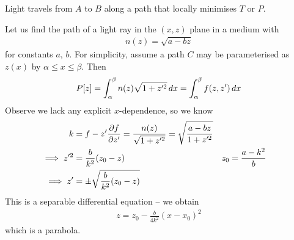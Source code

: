 \documentclass{../../template/note}
\begin{document}
    \begin{proposition}
        Light travels from $A$ to $B$ along a path that locally minimises $T$ or $P$.
    \end{proposition}
    
    \begin{example*}
        Let us find the path of a light ray in the $(x, z)$ plane in a medium with
        \begin{align*}
            n(z) = \sqrt{a-bz}
        \end{align*}
        for constants $a$, $b$. For simplicity, assume a path $C$ may be parameterised as $z(x)$ by $\alpha \leq x \leq \beta$. Then
        \begin{align*}
            P[z] = \int_\alpha^\beta n(z) \sqrt{1+z'^2} \,d{x} = \int_\alpha^\beta f(z, z') \,d{x}
        \end{align*}
        Observe we lack any explicit $x$-dependence, so we know
        \begin{align*}
            k &= f - z' \pd{f}{z'} = \frac{n(z)}{\sqrt{1+z'^2}} = \sqrt{\frac{a-bz}{1+z'^2}} \\
            \implies z'^2 &= \frac{b}{k^2}(z_0-z) && z_0 = \frac{a-k^2}{b} \\
            \implies z' &= \pm \sqrt{\frac{b}{k^2}(z_0-z)} 
        \end{align*}
        This is a separable differential equation -- we obtain
        \begin{align*}
            z = z_0 - \frac{b}{4k^2}(x-x_0)^2
        \end{align*}
        which is a parabola.      
    \end{example*}
    
\end{document}
